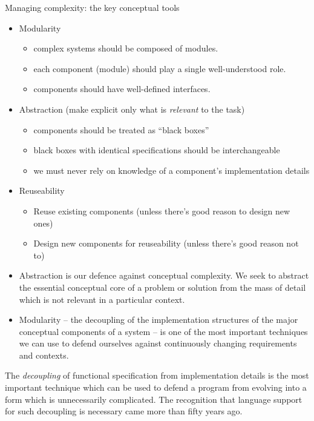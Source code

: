 \documentclass{ip3}
\begin{document}
\begin{foil}
Managing complexity: the key conceptual tools
 \begin{itemize}
         \vfill\item Modularity
         \begin{itemize}
                 \item complex systems should be composed of modules.
                 \item each component (module) should play a single well-understood role.               
                 \item components should have well-defined interfaces.
          \end{itemize}
          \vfill\item Abstraction (make explicit only what is \textit{relevant} to the task)
                  \begin{itemize}                        
                          \item components should be treated as ``black boxes''
                          \item black boxes with identical specifications should be interchangeable
                          \item we must never rely on knowledge of a component's implementation details
                  \end{itemize}                
          \vfill\item Reuseability
          \begin{itemize}
                 \item Reuse existing components (unless there's
                 good reason to design new ones)
                 \item Design new components for reuseability
                 (unless there's good reason not to)
          \end{itemize}
 \end{itemize}
\begin{note}[Abstraction]
\begin{itemize}
\item Abstraction is our defence against conceptual complexity. We
seek to abstract the essential conceptual core of a problem or
solution from the mass of detail which is not relevant in a
particular context.

\item Modularity -- the decoupling of the implementation structures
of the major conceptual components of a system -- is one of the
most important techniques we can use to defend ourselves against
continuously changing requirements and contexts.
\end{itemize}
\end{note}
\begin{note}[]
The \textit{decoupling} of functional specification from
implementation details is the most important technique which
can be used to defend a program from evolving into a form which
is unnecessarily complicated. The recognition that language
support for such decoupling is necessary came more than fifty
years ago. 


\end{note}
\end{foil}
\end{document}
